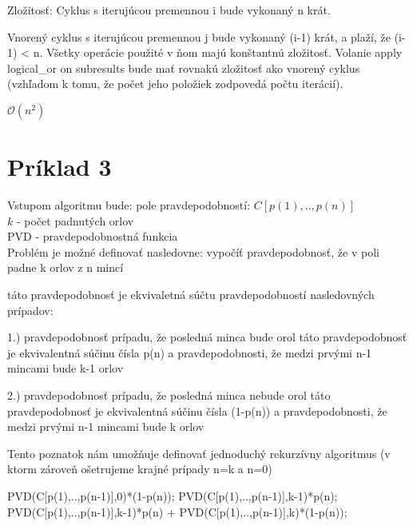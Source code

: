\documentclass[paper=a4, fontsize=11pt]{scrartcl} %
\numberwithin{equation}{section} %
\numberwithin{figure}{section} %
\numberwithin{table}{section} %
\begin{document}
 
Zložitosť:
Cyklus s iterujúcou premennou i bude vykonaný n krát.

Vnorený cyklus s iterujúcou premennou j bude vykonaný (i-1) krát, a plaží, že (i-1) < n. Všetky operácie použité v ňom majú konštantnú zložitosť.
Volanie apply logical\_or on subresults bude mať rovnakú zložitosť ako vnorený cyklus (vzhľadom k tomu, že počet jeho položiek zodpovedá počtu iterácií).

$\mathcal{O}(n^2)$

\pagebreak


\section*{Príklad 3}

Vstupom algoritmu bude:
pole pravdepodobností: $C[p(1),..,p(n)]$\\
$k$ - počet padnutých orlov\\
PVD - pravdepodobnostná funkcia\\

Problém je možné definovať nasledovne: 
vypočíť pravdepodobnosť, že v poli padne k orlov z n mincí

táto pravdepodobnosť je ekvivaletná súčtu pravdepodobností nasledovných prípadov:

1.) pravdepodobnosť prípadu, že posledná minca bude orol
táto pravdepodobnosť je ekvivalentná súčinu čísla p(n) a pravdepodobnosti, že medzi prvými n-1 mincami bude k-1 orlov

2.) pravdepodobnosť prípadu, že posledná minca nebude orol
táto pravdepodobnosť je ekvivalentná súčinu čísla (1-p(n)) a pravdepodobnosti, že medzi prvými n-1 mincami bude k orlov

Tento poznatok nám umožňuje definovať jednoduchý rekurzívny algoritmus (v ktorm zároveň ošetrujeme krajné prípady n=k a n=0)

\begin{algorithmic}[1]
            \State \Return PVD(C[p(1),..,p(n-1)],0)*(1-p(n));
        \EndIf
            \State \Return PVD(C[p(1),..,p(n-1)],k-1)*p(n);
        \EndIf
        \State \Return PVD(C[p(1),..,p(n-1)],k-1)*p(n) + PVD(C[p(1),..,p(n-1)],k)*(1-p(n));
    \EndFunction
\end{algorithmic}
\ \\
\end{document}
